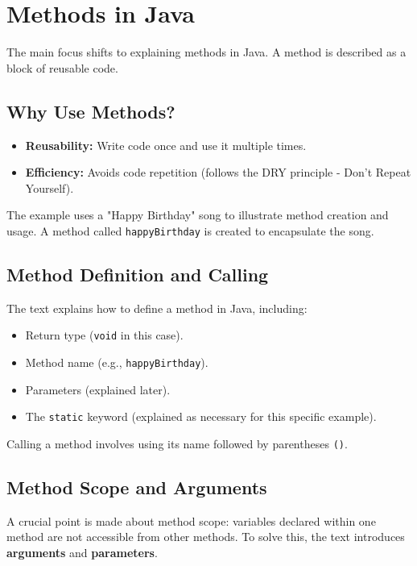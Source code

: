 \documentclass{article}
\begin{document}
\section{Methods in Java}

The main focus shifts to explaining methods in Java.  A method is described as a block of reusable code.

\subsection{Why Use Methods?}

\begin{itemize}
    \item \textbf{Reusability:} Write code once and use it multiple times.
    \item \textbf{Efficiency:} Avoids code repetition (follows the DRY principle - Don't Repeat Yourself).
\end{itemize}

The example uses a "Happy Birthday" song to illustrate method creation and usage.  A method called \texttt{happyBirthday} is created to encapsulate the song.

\subsection{Method Definition and Calling}

The text explains how to define a method in Java, including:

\begin{itemize}
    \item Return type (\texttt{void} in this case).
    \item Method name (e.g., \texttt{happyBirthday}).
    \item Parameters (explained later).
    \item The \texttt{static} keyword (explained as necessary for this specific example).
\end{itemize}

Calling a method involves using its name followed by parentheses \texttt{()}.

\subsection{Method Scope and Arguments}

A crucial point is made about method scope: variables declared within one method are not accessible from other methods.  To solve this, the text introduces \textbf{arguments} and \textbf{parameters}.
\end{document}

